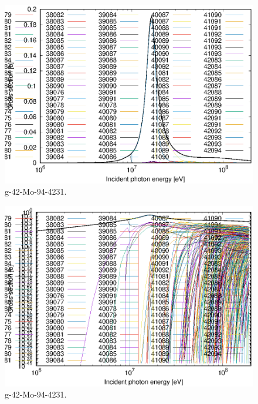 \begin{figure}
 \includegraphics[width=\linewidth]{eps/g_42-Mo-94_4231.eps}
  \caption{g-42-Mo-94-4231.}
\end{figure}
\begin{figure}
 \includegraphics[width=\linewidth]{eps-log/g_42-Mo-94_4231.eps}
 \caption{g-42-Mo-94-4231.}
\end{figure}
\newpage \clearpage

